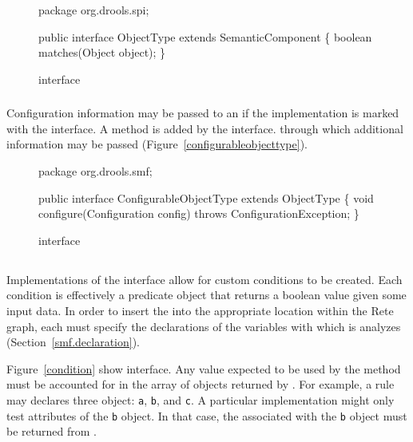 \begin{figure}
\begin{javaCodelisting}
package org.drools.spi;

public interface ObjectType
    extends SemanticComponent
\{
    boolean matches(Object object);
\}
\end{javaCodelisting}
\caption{ interface}
\label{objecttype}
\end{figure}

\subsubsection{}

Configuration information may be passed to an 
if the implementation is marked with the
 interface.
A  method
is added by the  interface.
through which additional information may be passed
(Figure~\vref{configurableobjecttype}).

\begin{figure}
\begin{javaCodelisting}
package org.drools.smf;

public interface ConfigurableObjectType
    extends ObjectType
\{
    void configure(Configuration config) throws ConfigurationException;
\}
\end{javaCodelisting}
\caption{ interface}
\label{configurableobjecttype}
\end{figure}

\subsection{}

Implementations of the  interface allow for
custom conditions to be created.  Each condition is effectively
a predicate object that returns a boolean value given some input
data.  In order to insert the  into the
appropriate location within the Rete graph, each
 must specify the declarations of the variables
with which is analyzes (Section~\vref{smf.declaration}).

Figure~\vref{condition} show  interface.
Any value expected to be used by the
method must be accounted for in the array of 
objects returned by .
For example, a rule may declares three object: \texttt{a}, \texttt{b},
and \texttt{c}.  A particular  implementation might
only test attributes of the \texttt{b} object.  In that case, the
 associated with the \texttt{b} object must
be returned from
.


